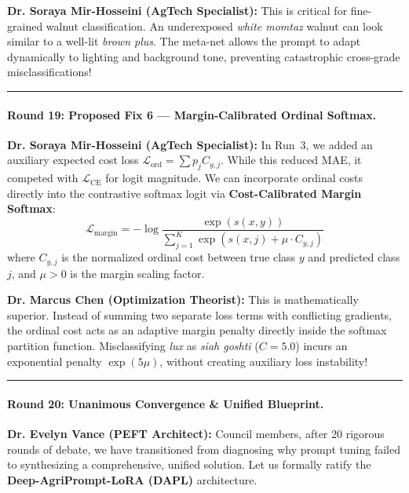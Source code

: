 \documentclass[letterpaper,11pt,leqno]{article}
\newcommand{\speakerVance}[1]{\noindent\textbf{\color{purple!80!black}Dr. Evelyn Vance (PEFT Architect):} #1\vspace{0.4em}}
\newcommand{\speakerMirHosseini}[1]{\noindent\textbf{\color{orange!80!black}Dr. Soraya Mir-Hosseini (AgTech Specialist):} #1\vspace{0.4em}}
\newcommand{\speakerChen}[1]{\noindent\textbf{\color{green!60!black}Dr. Marcus Chen (Optimization Theorist):} #1\vspace{0.4em}}
\begin{document}
\speakerMirHosseini{This is critical for fine-grained walnut classification. An underexposed \textit{white momtaz} walnut can look similar to a well-lit \textit{brown plus}. The meta-net allows the prompt to adapt dynamically to lighting and background tone, preventing catastrophic cross-grade misclassifications!}

\vspace{0.8em}\hrule\vspace{0.8em}

\paragraph{Round 19: Proposed Fix 6 — Margin-Calibrated Ordinal Softmax.}
\speakerMirHosseini{In Run~3, we added an auxiliary expected cost loss $\mathcal{L}_\mathrm{ord} = \sum p_j C_{y,j}$. While this reduced MAE, it competed with $\mathcal{L}_\mathrm{CE}$ for logit magnitude. We can incorporate ordinal costs directly into the contrastive softmax logit via \textbf{Cost-Calibrated Margin Softmax}:
\begin{equation}
    \mathcal{L}_\mathrm{margin} = -\log \frac{\exp\left( s(x, y) \right)}{\sum_{j=1}^K \exp\left( s(x, j) + \mu \cdot C_{y, j} \right)}
\end{equation}
where $C_{y, j}$ is the normalized ordinal cost between true class $y$ and predicted class $j$, and $\mu > 0$ is the margin scaling factor.}

\speakerChen{This is mathematically superior. Instead of summing two separate loss terms with conflicting gradients, the ordinal cost acts as an adaptive margin penalty directly inside the softmax partition function. Misclassifying \textit{lux} as \textit{siah goshti} ($C=5.0$) incurs an exponential penalty $\exp(5\mu)$, without creating auxiliary loss instability!}

\vspace{0.8em}\hrule\vspace{0.8em}

\paragraph{Round 20: Unanimous Convergence \& Unified Blueprint.}
\speakerVance{Council members, after 20 rigorous rounds of debate, we have transitioned from diagnosing why prompt tuning failed to synthesizing a comprehensive, unified solution. Let us formally ratify the \textbf{Deep-AgriPrompt-LoRA (DAPL)} architecture.}
\end{document}
